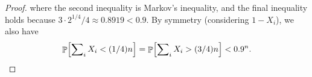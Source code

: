 \begin{proof}
    where the second inequality is Markov's inequality, and the final
    inequality holds because $3 \cdot 2^{1/4} / 4 \approx 0.8919 < 0.9$.
    By symmetry (considering $1 - X_i$), we also have
    \begin{equation*}
        \Prob{ \sum\nolimits_i X_i < (1/4) n }
        =%
        \Prob{ \sum\nolimits_i X_i > (3/4) n }
        <%
        0.9^n.
    \end{equation*}
\end{proof}










\ChapterEnd{}



